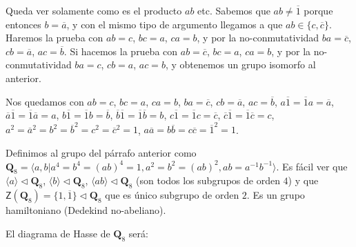 \documentclass[final,12pt,a4paper,twoside,fleqn]{extbook}
\newcommand{\grQ}{\ensuremath{\mathbf{Q}}}
\newcommand{\grclass}[1]{\ensuremath{\mathsf{#1}}}
\newcommand{\cyclicgr}[1]{\ensuremath{{\grclass{C}}_{#1}}}
\newcommand{\centro}[1]{\ensuremath{
        {\mathsf{Z}}
        {\left({#1}\right)}
}}
\theoremstyle{definition}
\theoremstyle{remark}
\begin{document}
    Queda ver solamente como es el producto $ab$ etc. Sabemos que $ab       \neq       \overline{1}$
porque entonces $b=\overline{a}$, y con el mismo tipo de argumento llegamos a que
$ab       \in \{c,\overline{c}\}$. Haremos la prueba con $ab=c$, $bc=a$, $ca=b$, y por la
no-conmutatividad $ba=\overline{c}$, $cb=\overline{a}$, $ac=\overline{b}$.
Si hacemos la prueba con $ab=\overline{c}$, $bc=a$, $ca=b$, y por la no-conmutatividad
$ba=c$, $cb=a$, $ac=b$, y obtenemos un grupo isomorfo al anterior.

    Nos quedamos con $ab=c$, $bc=a$, $ca=b$, $ba=\overline{c}$, $cb=\overline{a}$,
$ac=\overline{b}$, $a\overline{1}=\overline{1}a=\overline{a}$,
$\overline{a}\overline{1}=\overline{1}\overline{a}=a$,
$b\overline{1}=\overline{1}b=\overline{b}$,
$\overline{b}\overline{1}=\overline{1}\overline{b}=b$,
$c\overline{1}=\overline{1}c=\overline{c}$,
$\overline{c}\overline{1}=\overline{1}\overline{c}=c$,
$a^2=\overline{a}^2=b^2=\overline{b}^2=c^2=\overline{c}^2=1$,
$a\overline{a}=b\overline{b}=c\overline{c}=\overline{1}^2=1$.

    Definimos al grupo del p\'arrafo anterior como $\grQ_8 = \langle a,b | a^4=b^4=(ab)^4=1, a^2=b^2=(ab)^2, ab=a^{-1}b^{-1} \rangle$. Es f\'acil ver que $\langle a\rangle \lhd \grQ_8$, $\langle b\rangle \lhd \grQ_8$, $\langle ab\rangle \lhd \grQ_8$ (son todos los subgrupos de orden $4$) y que $\centro{\grQ_8}=\{1,\overline{1}\}\lhd\grQ_8$ que es \'unico subgrupo de orden $2$. Es un grupo hamiltoniano (Dedekind no-abeliano).

    El diagrama de Hasse de $\grQ_8$ ser\'a:


    \begin{center}
    \end{center}
\end{document}
